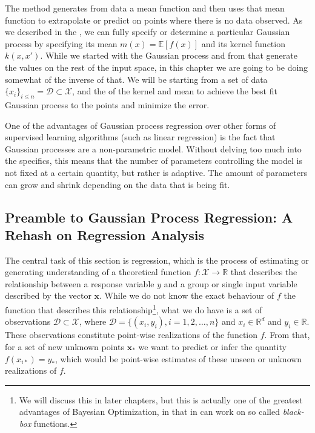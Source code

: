 The method generates from data a mean function and then uses that mean function to extrapolate or predict on points where there is no data observed. As we described in the , we can fully specify or determine a particular Gaussian process by specifying its mean $m(x) = \mathbb{E}[f(x)]$ and its kernel function $k(x,x')$. While  we started with the Gaussian process and from that generate the values on the rest of the input space, in this chapter we are going to be doing somewhat of the inverse of that. We will be starting from a set of data $\{ x_i \}_{i \leq n} = \mathcal{D} \subset \mathcal{X}$, and  the  of the kernel and mean to achieve the best fit Gaussian process to the points and minimize the error. 

One of the advantages of Gaussian process regression over other forms of supervised learning algorithms (such as linear regression) is the fact that Gaussian processes are a non-parametric model. Without delving too much into the specifics, this means that the number of parameters controlling the model is not fixed at a certain quantity, but rather is adaptive. The amount of parameters can grow and shrink depending on the data that is being fit. 




\subsection{Preamble to Gaussian Process Regression: A Rehash on Regression Analysis}

The central task of this section is regression, which is the process of estimating or generating understanding of a theoretical function $f: \mathcal{X} \rightarrow \mathbb{R}$ that describes the relationship between a response variable $y$ and a group or single input variable described by the vector $\boldsymbol{x}$. While we do not know the exact behaviour of $f$ the function that describes this relationship\footnote{We will discuss this in later chapters, but this is actually one of the greatest advantages of Bayesian Optimization, in that in can work on so called \textit{black-box} functions.}, what we do have is a set of observations $\mathcal{D} \subset \mathcal{X}$, where $\mathcal{D} = \{ (x_i, y_i), i = 1,2,\ldots, n \}$ and $x_i \in \mathbb{R}^d$ and $y_i \in \mathbb{R}$. These observations constitute point-wise realizations of the function $f$. From that, for a set of new unknown points $\boldsymbol{x}_*$ we want to predict or infer the quantity $f(x_{i*}) = y_*$, which would be point-wise estimates of these unseen or unknown realizations of $f$. 

